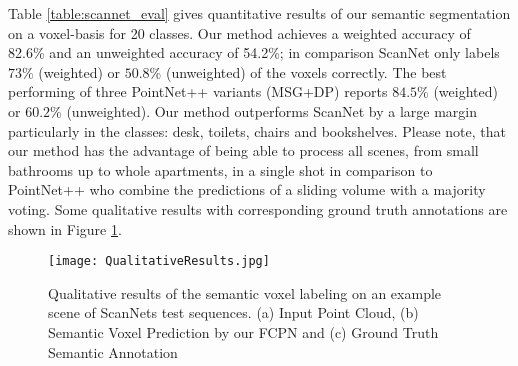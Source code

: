 \documentclass[runningheads]{llncs}
\begin{document}
Table \ref{table:scannet_eval} gives quantitative results of our semantic segmentation on a voxel-basis for 20 classes. Our method achieves a weighted accuracy of 82.6\% and an unweighted accuracy of 54.2\%; in comparison ScanNet only labels $73\%$ (weighted) or $50.8\%$ (unweighted) of the voxels correctly. The best performing of three PointNet++ variants (MSG+DP) reports $84.5\%$ (weighted) or $60.2\%$ (unweighted). Our method outperforms ScanNet by a large margin particularly in the classes: desk, toilets, chairs and bookshelves. Please note, that our method has the advantage of being able to process all scenes, from small bathrooms up to whole apartments, in a single shot in comparison to PointNet++ who combine the predictions of a sliding volume with a majority voting. Some qualitative results with corresponding ground truth annotations are shown in Figure \ref{fig:qualitative_results}.

\begin{figure}[h!]
    \centering
 \texttt{[image: QualitativeResults.jpg]}
    \caption{Qualitative results of the semantic voxel labeling on an example scene of ScanNets test sequences. (a) Input Point Cloud, (b) Semantic Voxel Prediction by our FCPN and (c) Ground Truth Semantic Annotation}
    \label{fig:qualitative_results} 
\end{figure}
\newpage

\end{document}
